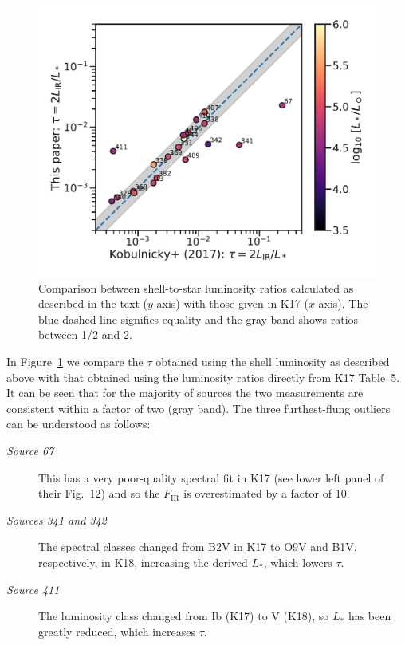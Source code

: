 \begin{figure}
  \centering
  \includegraphics[width=\linewidth]{figs/K17-tau-comparison}
  \caption{Comparison between shell-to-star luminosity ratios
    calculated as described in the text (\(y\) axis) with those given
    in K17 (\(x\) axis).  The blue dashed line signifies equality and
    the gray band shows ratios between 1/2 and 2.}
  \label{fig:k17-k18-comparison}
\end{figure}

In Figure~\ref{fig:k17-k18-comparison} we compare the \(\tau\) obtained
using the shell luminosity as described above with that obtained using
the luminosity ratios directly from K17 Table~5.  It can be seen that
for the majority of sources the two measurements are consistent within
a factor of two (gray band).  The three furthest-flung outliers can be
understood as follows:
\begin{description}
\item[\textit{Source 67}] This has a very poor-quality spectral fit in
  K17 (see lower left panel of their Fig.~12) and so the
  \(F_{\text{IR}}\) is overestimated by a factor of 10.
\item[\textit{Sources 341 and 342}] The spectral classes changed from
  B2V in K17 to O9V and B1V, respectively, in K18, increasing the
  derived \(L_*\), which lowers \(\tau\).
\item[\textit{Source 411}] The luminosity class changed from Ib (K17)
  to V (K18), so \(L_*\) has been greatly reduced, which increases
  \(\tau\).
\end{description}

